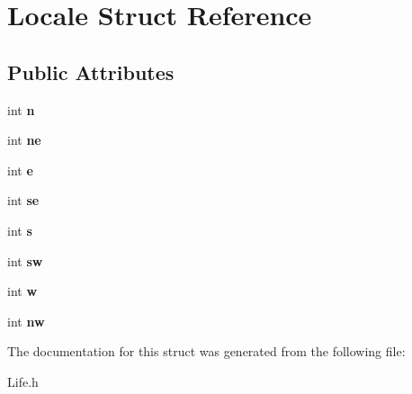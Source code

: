 \hypertarget{structLocale}{\section{Locale Struct Reference}
\label{structLocale}
}
\subsection*{Public Attributes}
\begin{DoxyCompactItemize}
\item 
\hypertarget{structLocale_ac655747bc826e31f01e8e5acfb5f6268}{int {\bfseries n}}\label{structLocale_ac655747bc826e31f01e8e5acfb5f6268}

\item 
\hypertarget{structLocale_a37af295258b1421ae8e0a865462153bf}{int {\bfseries ne}}\label{structLocale_a37af295258b1421ae8e0a865462153bf}

\item 
\hypertarget{structLocale_a9568285f2119b9ce5dff2505f35b064f}{int {\bfseries e}}\label{structLocale_a9568285f2119b9ce5dff2505f35b064f}

\item 
\hypertarget{structLocale_a1bd7acefe62da8a46718881544f85d26}{int {\bfseries se}}\label{structLocale_a1bd7acefe62da8a46718881544f85d26}

\item 
\hypertarget{structLocale_a06131abdca4f375798ec1114a966bd28}{int {\bfseries s}}\label{structLocale_a06131abdca4f375798ec1114a966bd28}

\item 
\hypertarget{structLocale_a41d08cd7df25b24230eadc9e82b15f62}{int {\bfseries sw}}\label{structLocale_a41d08cd7df25b24230eadc9e82b15f62}

\item 
\hypertarget{structLocale_ac592efb1d5356f2f180fb8cb9b8eeee4}{int {\bfseries w}}\label{structLocale_ac592efb1d5356f2f180fb8cb9b8eeee4}

\item 
\hypertarget{structLocale_a2ab054e7597d801de5821c56ce4baf9e}{int {\bfseries nw}}\label{structLocale_a2ab054e7597d801de5821c56ce4baf9e}

\end{DoxyCompactItemize}


The documentation for this struct was generated from the following file\-:\begin{DoxyCompactItemize}
\item 
Life.\-h\end{DoxyCompactItemize}
